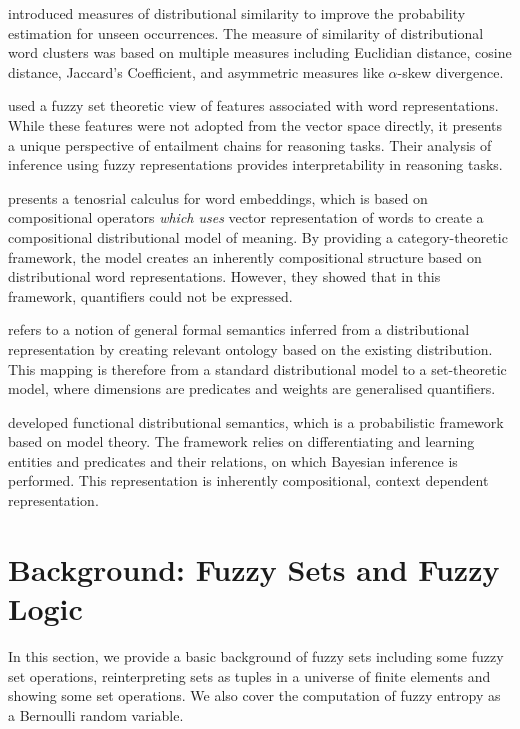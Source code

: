 \documentclass[11pt]{book}
\newcommand{\citet}[1]{\cite{#1}}
\begin{document}
\citet{lee1999measures} introduced measures of distributional similarity to
improve the probability estimation for unseen occurrences. The measure of
similarity of distributional word clusters was based on multiple measures
including Euclidian distance, cosine distance, Jaccard's Coefficient, and
asymmetric measures like $\alpha$-skew divergence.

\citet{bergmair2011monte} used a fuzzy set theoretic view of features
associated with word representations. While these features were not adopted
from the vector space directly, it presents a unique perspective of entailment
chains for reasoning tasks. Their analysis of inference using fuzzy
representations provides interpretability in reasoning tasks.

\citet{grefenstette2013towards} presents a tenosrial calculus for word
embeddings, which is based on compositional operators \emph{which uses} vector
representation of words to create a compositional distributional model of
meaning. By providing a category-theoretic framework, the model creates an
inherently compositional structure based on distributional word
representations. However, they showed that in this framework, quantifiers could
not be expressed.

\citet{herbelot2015building} refers to a notion of general formal semantics
inferred from a distributional representation by creating relevant ontology
based on the existing distribution. This mapping is therefore from a standard
distributional model to a set-theoretic model, where dimensions are predicates
and weights are generalised quantifiers.

\citet{emerson2016functional, emerson2017semantic} developed functional
distributional semantics, which is a probabilistic framework based on model
theory. The framework relies on differentiating and learning entities and
predicates and their relations, on which Bayesian inference is performed. This
representation is inherently compositional, context dependent representation.

\section{Background: Fuzzy Sets and Fuzzy Logic} \label{sec: math}

In this section, we provide a basic background of fuzzy sets including some
fuzzy set operations, reinterpreting sets as tuples in a universe of finite
elements and showing some set operations. We also cover the computation of
fuzzy entropy as a Bernoulli random variable.
\end{document}
